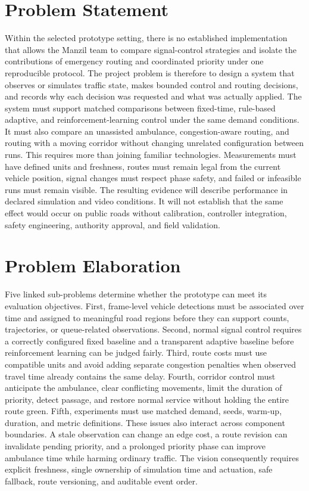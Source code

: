 \section{Problem Statement}

Within the selected prototype setting, there is no established implementation that allows the Manzil team to compare signal-control strategies and isolate the contributions of emergency routing and coordinated priority under one reproducible protocol. The project problem is therefore to design a system that observes or simulates traffic state, makes bounded control and routing decisions, and records why each decision was requested and what was actually applied. The system must support matched comparisons between fixed-time, rule-based adaptive, and reinforcement-learning control under the same demand conditions. It must also compare an unassisted ambulance, congestion-aware routing, and routing with a moving corridor without changing unrelated configuration between runs. This requires more than joining familiar technologies. Measurements must have defined units and freshness, routes must remain legal from the current vehicle position, signal changes must respect phase safety, and failed or infeasible runs must remain visible. The resulting evidence will describe performance in declared simulation and video conditions. It will not establish that the same effect would occur on public roads without calibration, controller integration, safety engineering, authority approval, and field validation.

\section{Problem Elaboration}

Five linked sub-problems determine whether the prototype can meet its evaluation objectives. First, frame-level vehicle detections must be associated over time and assigned to meaningful road regions before they can support counts, trajectories, or queue-related observations. Second, normal signal control requires a correctly configured fixed baseline and a transparent adaptive baseline before reinforcement learning can be judged fairly. Third, route costs must use compatible units and avoid adding separate congestion penalties when observed travel time already contains the same delay. Fourth, corridor control must anticipate the ambulance, clear conflicting movements, limit the duration of priority, detect passage, and restore normal service without holding the entire route green. Fifth, experiments must use matched demand, seeds, warm-up, duration, and metric definitions. These issues also interact across component boundaries. A stale observation can change an edge cost, a route revision can invalidate pending priority, and a prolonged priority phase can improve ambulance time while harming ordinary traffic. The vision consequently requires explicit freshness, single ownership of simulation time and actuation, safe fallback, route versioning, and auditable event order.

